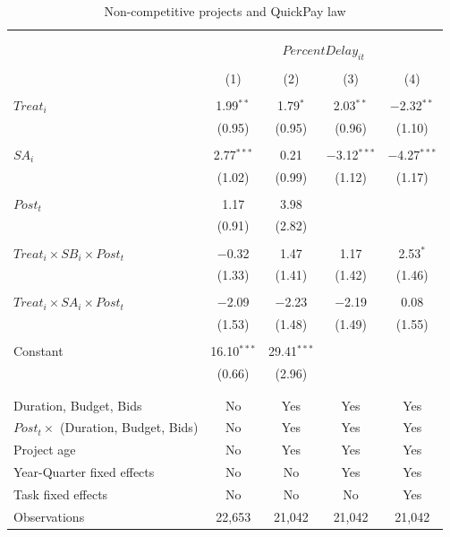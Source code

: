 \documentclass[
]{article}
\begin{document}
\begin{table}[H] \centering 
  \caption{Non-competitive projects and QuickPay law} 
  \label{} 
\small 
\begin{tabular}{@{\extracolsep{-2pt}}lcccc} 
\\[-1.8ex]\hline 
\hline \\[-1.8ex] 
\\[-1.8ex] & \multicolumn{4}{c}{$PercentDelay_{it}$  } \\ 
\\[-1.8ex] & (1) & (2) & (3) & (4)\\ 
\hline \\[-1.8ex] 
 $Treat_i$ & 1.99$^{**}$ & 1.79$^{*}$ & 2.03$^{**}$ & $-$2.32$^{**}$ \\ 
  & (0.95) & (0.95) & (0.96) & (1.10) \\ 
  & & & & \\ 
 $SA_i$ & 2.77$^{***}$ & 0.21 & $-$3.12$^{***}$ & $-$4.27$^{***}$ \\ 
  & (1.02) & (0.99) & (1.12) & (1.17) \\ 
  & & & & \\ 
 $Post_t$ & 1.17 & 3.98 &  &  \\ 
  & (0.91) & (2.82) &  &  \\ 
  & & & & \\ 
 $Treat_i \times SB_i \times Post_t$ & $-$0.32 & 1.47 & 1.17 & 2.53$^{*}$ \\ 
  & (1.33) & (1.41) & (1.42) & (1.46) \\ 
  & & & & \\ 
 $Treat_i \times SA_i \times Post_t$ & $-$2.09 & $-$2.23 & $-$2.19 & 0.08 \\ 
  & (1.53) & (1.48) & (1.49) & (1.55) \\ 
  & & & & \\ 
 Constant & 16.10$^{***}$ & 29.41$^{***}$ &  &  \\ 
  & (0.66) & (2.96) &  &  \\ 
  & & & & \\ 
\hline \\[-1.8ex] 
Duration, Budget, Bids & No & Yes & Yes & Yes \\ 
$Post_t \times $  (Duration, Budget, Bids) & No & Yes & Yes & Yes \\ 
Project age & No & Yes & Yes & Yes \\ 
Year-Quarter fixed effects & No & No & Yes & Yes \\ 
Task fixed effects & No & No & No & Yes \\ 
Observations & 22,653 & 21,042 & 21,042 & 21,042 \\ 

\end{tabular}
\end{table}
\end{document}
